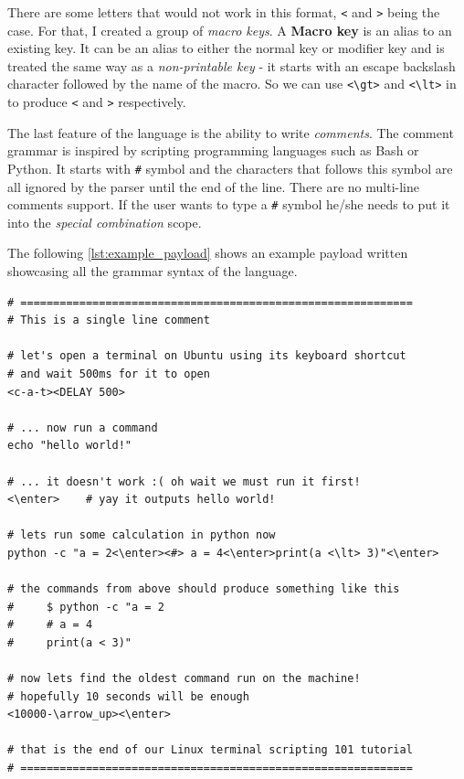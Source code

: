 There are some letters that would not work in this format, \verb|<| and \verb|>| being the case. For that, I created a group of \emph{macro keys}. A \textbf{Macro key} is an alias to an existing key. It can be an alias to either the normal key or modifier key and is treated the same way as a \emph{non-printable key} \-- it starts with an escape backslash character followed by the name of the macro. So we can use \verb|<\gt>| and \verb|<\lt>| in to produce \verb|<| and \verb|>| respectively. 

The last feature of the language is the ability to write \emph{comments}. The comment grammar is inspired by scripting programming languages such as Bash or Python. It starts with \verb|#| symbol and the characters that follows this symbol are all ignored by the parser until the end of the line. There are no multi-line comments support. If the user wants to type a \verb|#| symbol he/she needs to put it into the \emph{special combination} scope. 

The following \autoref{lst:example_payload} shows an example payload written showcasing all the grammar syntax of the language.
\begin{lstlisting}[caption={Example payload in custom language.},
                   label={lst:example_payload}]
# ============================================================
# This is a single line comment

# let's open a terminal on Ubuntu using its keyboard shortcut
# and wait 500ms for it to open
<c-a-t><DELAY 500>

# ... now run a command
echo "hello world!"

# ... it doesn't work :( oh wait we must run it first!
<\enter>    # yay it outputs hello world!

# lets run some calculation in python now
python -c "a = 2<\enter><#> a = 4<\enter>print(a <\lt> 3)"<\enter>

# the commands from above should produce something like this
#     $ python -c "a = 2
#     # a = 4
#     print(a < 3)"

# now lets find the oldest command run on the machine!
# hopefully 10 seconds will be enough
<10000-\arrow_up><\enter>

# that is the end of our Linux terminal scripting 101 tutorial
# ============================================================
\end{lstlisting}

